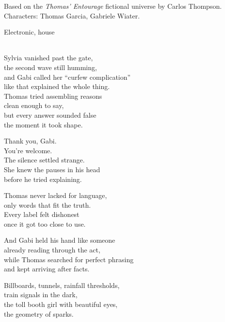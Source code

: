 

\begin{notes}
Based on the \emph{Thomas’ Entourage} fictional universe by Carlos Thompson.\\
Characters: Thomas Garcia, Gabriele Wiater.\\
\end{notes}

\begin{style}
Electronic, house
\end{style}

\begin{lyrics}

\\
Sylvia vanished past the gate,\\
the second wave still humming,\\
and Gabi called her “curfew complication”\\
like that explained the whole thing.\\
Thomas tried assembling reasons\\
clean enough to say,\\
but every answer sounded false\\
the moment it took shape.

Thank you, Gabi.\\
You’re welcome.\\
The silence settled strange.\\
She knew the pauses in his head\\
before he tried explaining.

Thomas never lacked for language,\\
only words that fit the truth.\\
Every label felt dishonest\\
once it got too close to use.

And Gabi held his hand like someone\\
already reading through the act,\\
while Thomas searched for perfect phrasing\\
and kept arriving after facts.

Billboards, tunnels, rainfall thresholds,\\
train signals in the dark,\\
the toll booth girl with beautiful eyes,\\
the geometry of sparks.


\end{lyrics}
